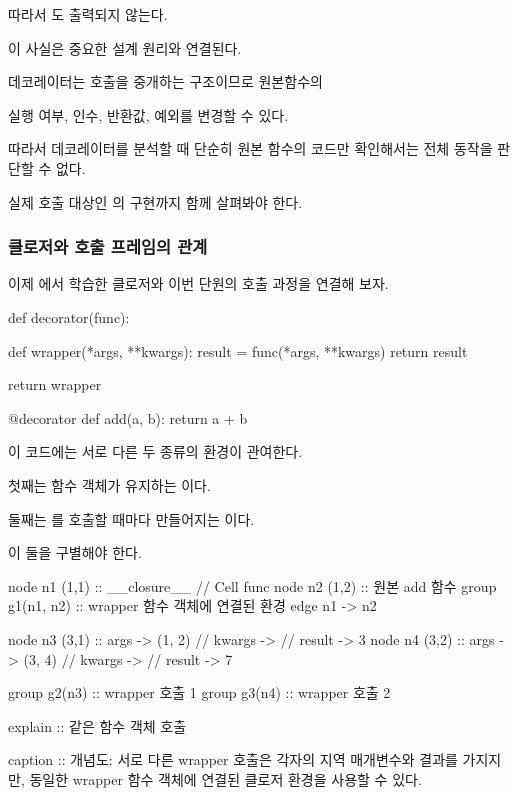 따라서 도 출력되지 않는다.

이 사실은 중요한 설계 원리와 연결된다.

\begin{dhksmry}[centered]
데코레이터는 호출을 중개하는 구조이므로 원본함수의

실행 여부, 인수, 반환값, 예외를 변경할 수 있다.
\end{dhksmry}

따라서 데코레이터를 분석할 때 단순히 원본 함수의 코드만 확인해서는 전체 동작을 판단할 수 없다.

실제 호출 대상인 의 구현까지 함께 살펴봐야 한다.

\subsubsection{클로저와 호출 프레임의 관계}

이제 에서 학습한 클로저와 이번 단원의 호출 과정을 연결해 보자.

\begin{dhkcode}
def decorator(func):

    def wrapper(*args, **kwargs):
        result = func(*args, **kwargs)
        return result

    return wrapper


@decorator
def add(a, b):
    return a + b
\end{dhkcode}

이 코드에는 서로 다른 두 종류의 환경이 관여한다.

첫째는  함수 객체가 유지하는 이다.

둘째는 를 호출할 때마다 만들어지는 이다.

이 둘을 구별해야 한다.

\begin{dhkgraph}[uniform]
node n1 (1,1) :: __closure__ // Cell func
node n2 (1,2) :: 원본 add 함수
group g1(n1, n2) :: wrapper 함수 객체에 연결된 환경
edge n1 -> n2

node n3 (3,1) :: args -> (1, 2) // kwargs -> // result -> 3
node n4 (3,2) :: args -> (3, 4) // kwargs -> // result -> 7

group g2(n3) :: wrapper 호출 1
group g3(n4) :: wrapper 호출 2

explain :: 같은 함수 객체 호출

caption :: 개념도: 서로 다른 wrapper 호출은 각자의 지역 매개변수와 결과를 가지지만, 동일한 wrapper 함수 객체에 연결된 클로저 환경을 사용할 수 있다.
\end{dhkgraph}

